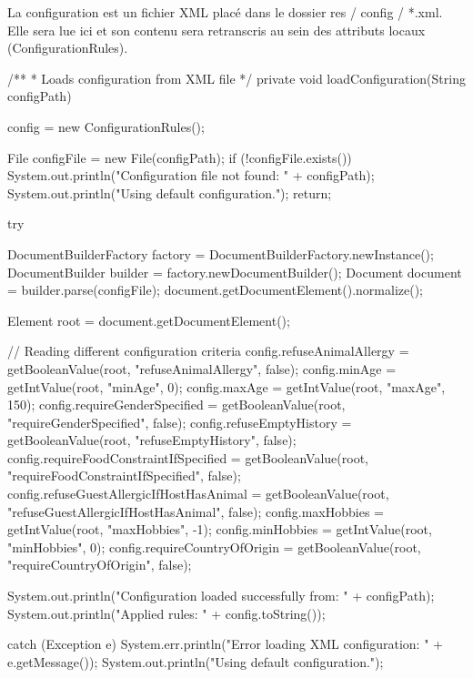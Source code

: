 \documentclass{mytex}
\begin{document}

La configuration est un fichier XML placé dans le dossier res / config / *.xml. Elle sera lue ici et son contenu sera retranscris au sein des attributs locaux (ConfigurationRules).

\begin{codebox}
/**
* Loads configuration from XML file
*/
private void loadConfiguration(String configPath) {
	config = new ConfigurationRules();
	
	File configFile = new File(configPath);
	if (!configFile.exists()) {
		System.out.println("Configuration file not found: " + configPath);
		System.out.println("Using default configuration.");
		return;
	}
	
	try {
		DocumentBuilderFactory factory = DocumentBuilderFactory.newInstance();
		DocumentBuilder builder = factory.newDocumentBuilder();
		Document document = builder.parse(configFile);
		document.getDocumentElement().normalize();
		
		Element root = document.getDocumentElement();
		
		// Reading different configuration criteria
		config.refuseAnimalAllergy = getBooleanValue(root, "refuseAnimalAllergy", false);
		config.minAge = getIntValue(root, "minAge", 0);
		config.maxAge = getIntValue(root, "maxAge", 150);
		config.requireGenderSpecified = getBooleanValue(root, "requireGenderSpecified", false);
		config.refuseEmptyHistory = getBooleanValue(root, "refuseEmptyHistory", false);
		config.requireFoodConstraintIfSpecified = getBooleanValue(root, "requireFoodConstraintIfSpecified", false);
		config.refuseGuestAllergicIfHostHasAnimal = getBooleanValue(root, "refuseGuestAllergicIfHostHasAnimal", false);
		config.maxHobbies = getIntValue(root, "maxHobbies", -1);
		config.minHobbies = getIntValue(root, "minHobbies", 0);
		config.requireCountryOfOrigin = getBooleanValue(root, "requireCountryOfOrigin", false);
		
		System.out.println("Configuration loaded successfully from: " + configPath);
		System.out.println("Applied rules: " + config.toString());
		
	} catch (Exception e) {
		System.err.println("Error loading XML configuration: " + e.getMessage());
		System.out.println("Using default configuration.");
	}
}

\end{codebox}
\end{document}
